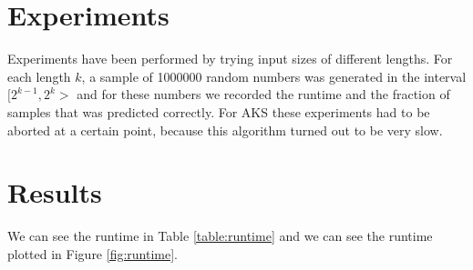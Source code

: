 
\section{Experiments}
\label{sec:experiments}

Experiments have been performed by trying input sizes of different lengths.
For each length $k$, a sample of 1000000 random numbers was generated in the interval $[2^{k-1}, 2^k>$ and for these numbers we recorded the runtime and the fraction of samples that was predicted correctly.
    For AKS these experiments had to be aborted at a certain point, because this algorithm turned out to be very slow.

\section{Results}

We can see the runtime in Table \ref{table:runtime} and we can see the runtime plotted in Figure \ref{fig:runtime}.

